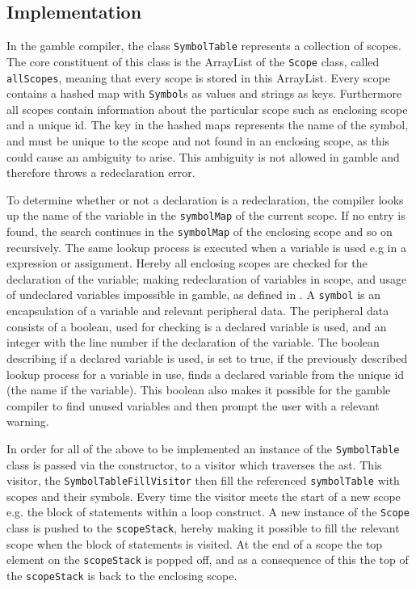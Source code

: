 \subsection*{Implementation}
In the \gls{gamble} compiler, the class \texttt{SymbolTable} represents a collection of scopes.
The core constituent of this class is the ArrayList of the \texttt{Scope} class, called \texttt{allScopes}, meaning that every scope is stored in this ArrayList.
Every scope contains a hashed map with \texttt{Symbol}s as values and strings as keys.
Furthermore all scopes contain information about the particular scope such as enclosing scope and a unique id. 
The key in the hashed maps represents the name of the symbol, and must be unique to the scope and not found in an enclosing scope, as this could cause an ambiguity to arise.
This ambiguity is not allowed in \gls{gamble} and therefore throws a redeclaration error.

To determine whether or not a declaration is a redeclaration, the compiler looks up the name of the variable in the \texttt{symbolMap} of the current scope.
If no entry is found, the search continues in the \texttt{symbolMap} of the enclosing scope and so on recursively.
The same lookup process is executed when a variable is used e.g in a expression or assignment.
Hereby all enclosing scopes are checked for the declaration of the variable; making redeclaration of variables in scope, and usage of undeclared variables impossible in \gls{gamble}, as defined in .
A \texttt{symbol} is an encapsulation of a variable and relevant peripheral data.
The peripheral data consists of a boolean, used for checking is a declared variable is used, and an integer with the line number if the declaration of the variable.
The boolean describing if a declared variable is used, is set to true, if the previously described lookup process for a variable in use, finds a declared variable from the unique id (the name if the variable).
This boolean also makes it possible for the \gls{gamble} compiler to find unused variables and then prompt the user with a relevant warning.

In order for all of the above to be implemented an instance of the \texttt{SymbolTable} class is passed via the constructor, to a visitor which traverses the \acrshort{ast}.
This visitor, the \texttt{SymbolTableFillVisitor} then fill the referenced \texttt{symbolTable} with scopes and their symbols.
Every time the visitor meets the start of a new scope e.g. the block of statements within a loop construct.
A new instance of the \texttt{Scope} class is pushed to the \texttt{scopeStack}, hereby making it possible to fill the relevant scope when the block of statements is visited.
At the end of a scope the top element on the \texttt{scopeStack} is popped off, and as a consequence of this the top of the \texttt{scopeStack} is back to the enclosing scope.